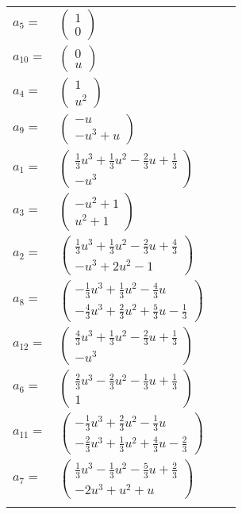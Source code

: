 \documentclass[1p]{elsarticle_modified}
\theoremstyle{definition}
\begin{document}
\begin{tabular}{m{7pt} m{180pt} m{7pt} m{180pt} }
\flushright $a_{5}=$&$\begin{pmatrix}1\\0\end{pmatrix}$ \\
\flushright $a_{10}=$&$\begin{pmatrix}0\\u\end{pmatrix}$ \\
\flushright $a_{4}=$&$\begin{pmatrix}1\\u^2\end{pmatrix}$ \\
\flushright $a_{9}=$&$\begin{pmatrix}- u\\- u^3+u\end{pmatrix}$ \\
\flushright $a_{1}=$&$\begin{pmatrix}\frac{1}{3} u^3+\frac{1}{3} u^2-\frac{2}{3} u+\frac{1}{3}\\- u^3\end{pmatrix}$ \\
\flushright $a_{3}=$&$\begin{pmatrix}- u^2+1\\u^2+1\end{pmatrix}$ \\
\flushright $a_{2}=$&$\begin{pmatrix}\frac{1}{3} u^3+\frac{1}{3} u^2-\frac{2}{3} u+\frac{4}{3}\\- u^3+2 u^2-1\end{pmatrix}$ \\
\flushright $a_{8}=$&$\begin{pmatrix}-\frac{1}{3} u^3+\frac{1}{3} u^2-\frac{4}{3} u\\-\frac{4}{3} u^3+\frac{2}{3} u^2+\frac{5}{3} u-\frac{1}{3}\end{pmatrix}$ \\
\flushright $a_{12}=$&$\begin{pmatrix}\frac{4}{3} u^3+\frac{1}{3} u^2-\frac{2}{3} u+\frac{1}{3}\\- u^3\end{pmatrix}$ \\
\flushright $a_{6}=$&$\begin{pmatrix}\frac{2}{3} u^3-\frac{2}{3} u^2-\frac{1}{3} u+\frac{1}{3}\\1\end{pmatrix}$ \\
\flushright $a_{11}=$&$\begin{pmatrix}-\frac{1}{3} u^3+\frac{2}{3} u^2-\frac{1}{3} u\\-\frac{2}{3} u^3+\frac{1}{3} u^2+\frac{4}{3} u-\frac{2}{3}\end{pmatrix}$ \\
\flushright $a_{7}=$&$\begin{pmatrix}\frac{1}{3} u^3-\frac{1}{3} u^2-\frac{5}{3} u+\frac{2}{3}\\-2 u^3+u^2+u\end{pmatrix}$\\&\end{tabular}
\end{document}
